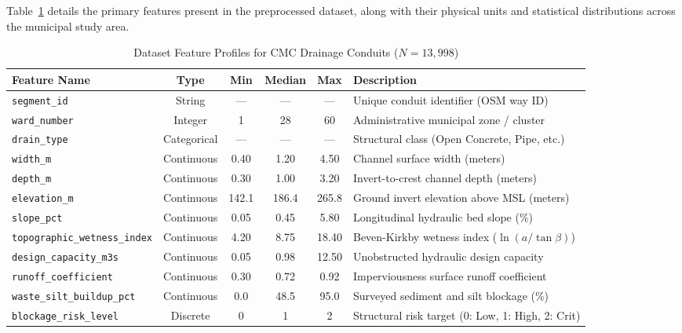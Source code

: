 \documentclass[12pt,a4paper]{report}
\begin{document}
Table~\ref{tab:dataset_features} details the primary features present in the preprocessed dataset, along with their physical units and statistical distributions across the municipal study area.

\begin{table}[h!]
\centering
\caption{Dataset Feature Profiles for CMC Drainage Conduits ($N = 13{,}998$)}
\label{tab:dataset_features}
\fontsize{9pt}{11pt}\selectfont
\begin{tabular}{|l|c|c|c|c|p{4.0cm}|}
\hline
\textbf{Feature Name} & \textbf{Type} & \textbf{Min} & \textbf{Median} & \textbf{Max} & \textbf{Description} \\
\hline
\texttt{segment\_id} & String & --- & --- & --- & Unique conduit identifier (OSM way ID) \\
\texttt{ward\_number} & Integer & 1 & 28 & 60 & Administrative municipal zone / cluster \\
\texttt{drain\_type} & Categorical & --- & --- & --- & Structural class (Open Concrete, Pipe, etc.) \\
\texttt{width\_m} & Continuous & 0.40 & 1.20 & 4.50 & Channel surface width (meters) \\
\texttt{depth\_m} & Continuous & 0.30 & 1.00 & 3.20 & Invert-to-crest channel depth (meters) \\
\texttt{elevation\_m} & Continuous & 142.1 & 186.4 & 265.8 & Ground invert elevation above MSL (meters) \\
\texttt{slope\_pct} & Continuous & 0.05 & 0.45 & 5.80 & Longitudinal hydraulic bed slope (\%) \\
\texttt{topographic\_wetness\_index} & Continuous & 4.20 & 8.75 & 18.40 & Beven-Kirkby wetness index ($\ln(a / \tan \beta)$) \\
\texttt{design\_capacity\_m3s} & Continuous & 0.05 & 0.98 & 12.50 & Unobstructed hydraulic design capacity \\
\texttt{runoff\_coefficient} & Continuous & 0.30 & 0.72 & 0.92 & Imperviousness surface runoff coefficient \\
\texttt{waste\_silt\_buildup\_pct} & Continuous & 0.0 & 48.5 & 95.0 & Surveyed sediment and silt blockage (\%) \\
\texttt{blockage\_risk\_level} & Discrete & 0 & 1 & 2 & Structural risk target (0: Low, 1: High, 2: Crit) \\
\hline
\end{tabular}
\end{table}
\end{document}
